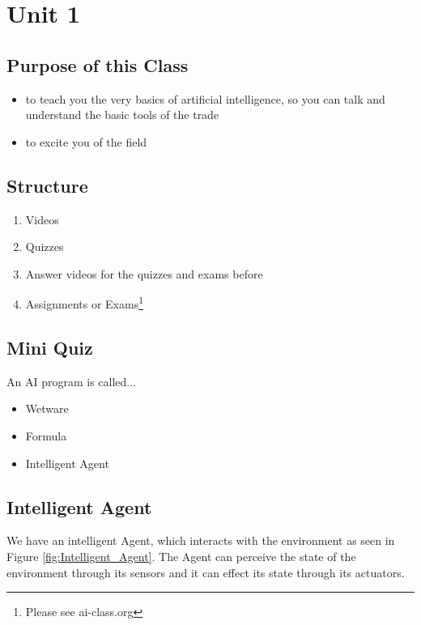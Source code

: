 \section{Unit 1}

\subsection{Purpose of this Class}
  \begin{itemize}
    \item to teach you the very basics of artificial intelligence, so you can talk and understand
    the basic tools of the trade
    \item to excite you of the field
  \end{itemize}

\subsection{Structure}
  \begin{enumerate}
    \item Videos
    \item Quizzes
    \item Answer videos for the quizzes and exams before
    \item Assignments or Exams\footnote{Please see ai-class.org}
  \end{enumerate}

\subsection{Mini Quiz}
  An AI program is called...\\

  \begin{itemize}
    \renewcommand{\labelitemi}{$\square$}
    \item Wetware
    \item Formula
    \item Intelligent Agent
  \end{itemize}


\subsection{Intelligent Agent}

  We have an intelligent Agent, which interacts with the environment as seen in Figure
  \ref{fig:Intelligent_Agent}. The Agent can perceive the state of the environment through its
  sensors and it can effect its state through its actuators.\\

